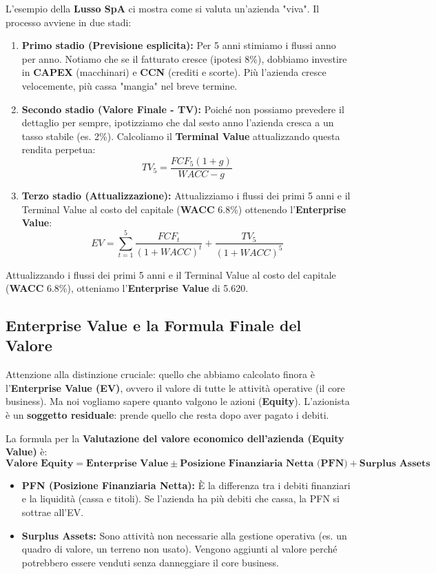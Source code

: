 \documentclass[a4paper,10pt]{article}
\begin{document}
L'esempio della \textbf{Lusso SpA} ci mostra come si valuta un'azienda "viva". Il processo avviene in due stadi:
\begin{enumerate}
    \item \textbf{Primo stadio (Previsione esplicita):} Per 5 anni stimiamo i flussi anno per anno. Notiamo che se il fatturato cresce (ipotesi 8\%), dobbiamo investire in \textbf{CAPEX} (macchinari) e \textbf{CCN} (crediti e scorte). Più l'azienda cresce velocemente, più cassa "mangia" nel breve termine.
    \item \textbf{Secondo stadio (Valore Finale - TV):} Poiché non possiamo prevedere il dettaglio per sempre, ipotizziamo che dal sesto anno l'azienda cresca a un tasso stabile (es. 2\%). Calcoliamo il \textbf{Terminal Value} attualizzando questa rendita perpetua:
    \[ TV_5 = \frac{FCF_5(1+g)}{WACC - g} \]
    \item \textbf{Terzo stadio (Attualizzazione):} Attualizziamo i flussi dei primi 5 anni e il Terminal Value al costo del capitale (\textbf{WACC} 6.8\%) ottenendo l'\textbf{Enterprise Value}:
    \[ EV = \sum_{t=1}^{5} \frac{FCF_t}{(1+WACC)^t} + \frac{TV_5}{(1+WACC)^5} \]
\end{enumerate}
Attualizzando i flussi dei primi 5 anni e il Terminal Value al costo del capitale (\textbf{WACC} 6.8\%), otteniamo l'\textbf{Enterprise Value} di 5.620.

\subsection*{Enterprise Value e la Formula Finale del Valore}

Attenzione alla distinzione cruciale: quello che abbiamo calcolato finora è l'\textbf{Enterprise Value (EV)}, ovvero il valore di tutte le attività operative (il core business). Ma noi vogliamo sapere quanto valgono le azioni (\textbf{Equity}).
L'azionista è un \textbf{soggetto residuale}: prende quello che resta dopo aver pagato i debiti.

La formula per la \textbf{Valutazione del valore economico dell'azienda (Equity Value)} è:
\[
\textbf{Valore Equity} = \textbf{Enterprise Value} \pm \textbf{Posizione Finanziaria Netta (PFN)} + \textbf{Surplus Assets}
\]

\begin{itemize}
    \item \textbf{PFN (Posizione Finanziaria Netta):} È la differenza tra i debiti finanziari e la liquidità (cassa e titoli). Se l'azienda ha più debiti che cassa, la PFN si sottrae all'EV.
    \item \textbf{Surplus Assets:} Sono attività non necessarie alla gestione operativa (es. un quadro di valore, un terreno non usato). Vengono aggiunti al valore perché potrebbero essere venduti senza danneggiare il core business.
\end{itemize}
\end{document}
